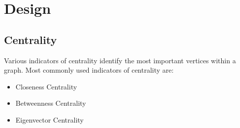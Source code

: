 \section{Design}
\label{Design}

%
%
%
%
%
%
%
%
%
%
%
%
%
%
%
%
%
%
%
%
%

\subsection{Centrality}
Various indicators of centrality identify the most important vertices
within a graph.  Most commonly used indicators of centrality are:
\begin{itemize}[leftmargin=*]
\item
Closeness Centrality
\item
Betweenness Centrality
\item
Eigenvector Centrality
\end{itemize}

